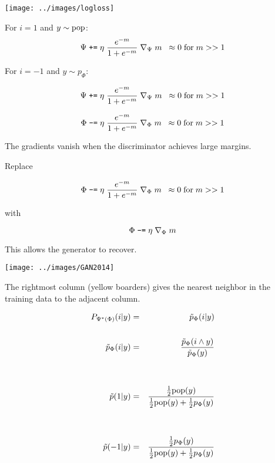 {\centerline{\texttt{[image: ../images/logloss]}}


For $i = 1$ and $y \sim \mathrm{pop}$:
$$\Psi \;\mbox{\tt +=} \; \eta\;\frac{e^{-m}}{1 + e^{-m}}\;\nabla_\Psi \; m \;\;\approx 0 \;\mbox{for}\;m >> 1$$

\vfill
For $i = -1$ and $y \sim p_\Phi$:

$$\Psi \;\mbox{\tt +=} \; \eta\;\frac{e^{-m}}{1 + e^{-m}}\;\nabla_\Psi\;m \;\;\approx 0 \;\mbox{for}\;m >> 1$$

\vfill
$$\Phi \;\mbox{\tt -=} \; \eta\;\frac{e^{-m}}{1 + e^{-m}}\;\nabla_\Phi\;m \;\;\approx 0 \;\mbox{for}\;m >> 1$$

\vfill
The gradients vanish when the discriminator achieves large margins.


Replace

$$\Phi \;\mbox{\tt -=} \; \eta\;\frac{e^{-m}}{1 + e^{-m}}\;\nabla_\Phi\; m \;\;\approx 0 \;\mbox{for}\;m >> 1$$

\vfill
with

$$\Phi \;\mbox{\tt -=} \; \eta\;\nabla_\Phi\;m$$

\vfill
This allows the generator to recover.

\centerline{\texttt{[image: ../images/GAN2014]}}
The rightmost column (yellow boarders) gives the nearest neighbor in the training data to the adjacent column.


\begin{eqnarray*}
P_{\Psi^*(\Phi)}(i|y) & = & \tilde{p}_\Phi(i|y) \\
\\
\tilde{p}_\Phi(i|y) & = & \frac{\tilde{p}_\Phi(i \wedge y)}{\tilde{p}_\Phi(y)} \\
\\
\\
\tilde{p}(1|y) & = & \frac{\frac{1}{2}\mathrm{pop}(y)}{\frac{1}{2}\mathrm{pop}(y) + \frac{1}{2}p_\Phi(y)} \\
\\
\\
\tilde{p}(-1|y) & = & \frac{\frac{1}{2}p_\Phi(y)}{\frac{1}{2}\mathrm{pop}(y) + \frac{1}{2}p_\Phi(y)}
\end{eqnarray*}


}
